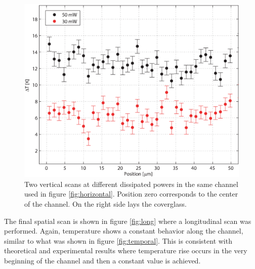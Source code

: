 \documentclass[twocolumn]{svjour3}       %
\begin{document}
\begin{figure}[h!]
\centering
\includegraphics[width=\columnwidth]{figs/vertical.eps}
\caption{Two vertical scans at different dissipated powers in the same channel used in figure \ref{fig:horizontal}. Position zero corresponds to the center of the channel. On the right side lays the coverglass.\label{fig:vertical}}
\end{figure}

The final spatial scan is shown in figure \ref{fig:long} where a longitudinal scan was performed. Again, temperature shows a constant behavior along the channel, similar to what was shown in figure \ref{fig:temporal}. This is consistent with theoretical and experimental results \cite{jouleteorico,xuan2008} where temperature rise occurs in the very beginning of the channel and then a constant value is achieved. 

%
\end{document}
